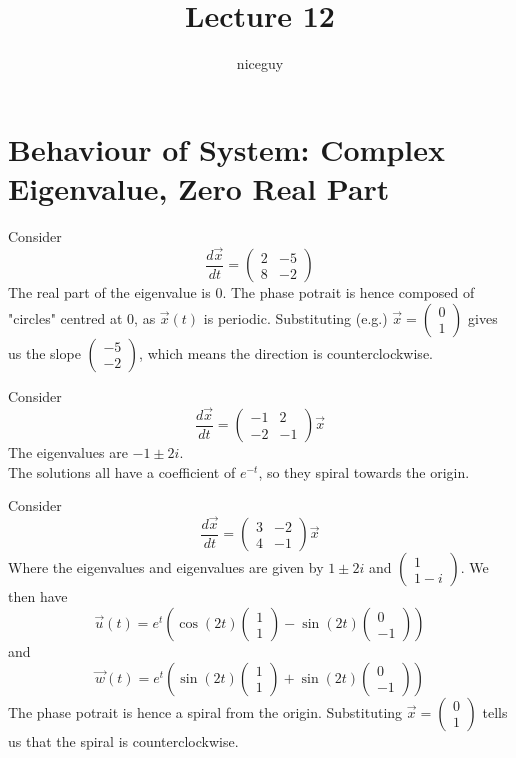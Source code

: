 \documentclass[12pt]{article}
\title{Lecture 12}
\author{niceguy}
\begin{document}
\maketitle

\section{Behaviour of System: Complex Eigenvalue, Zero Real Part}
Consider
$$\frac{d\vec{x}}{dt} = \begin{pmatrix} 2 & -5 \\ 8 & -2 \end{pmatrix}$$
The real part of the eigenvalue is 0. The phase potrait is hence composed of "circles" centred at 0, as $\vec{x}(t)$ is periodic. Substituting (e.g.) $\vec{x} = \begin{pmatrix} 0 \\ 1 \end{pmatrix}$ gives us the slope $\begin{pmatrix} -5 \\ -2 \end{pmatrix}$, which means the direction is counterclockwise.

\begin{ex}
	Consider
	$$\frac{d\vec{x}}{dt} = \begin{pmatrix} -1 & 2 \\ -2 & -1 \end{pmatrix} \vec{x}$$
	The eigenvalues are $-1 \pm 2i$. \\
	The solutions all have a coefficient of $e^{-t}$, so they spiral towards the origin.
\end{ex}

\begin{ex}
	Consider
	$$\frac{d\vec{x}}{dt} = \begin{pmatrix} 3 & -2 \\ 4 & -1 \end{pmatrix}\vec{x}$$
	Where the eigenvalues and eigenvalues are given by $1 \pm 2i$ and $\begin{pmatrix} 1 \\ 1-i \end{pmatrix}$. We then have
	$$\vec{u}(t) = e^t\left(\cos(2t)\begin{pmatrix} 1 \\ 1\end{pmatrix} - \sin(2t)\begin{pmatrix} 0 \\ -1\end{pmatrix}\right)$$
	and
	$$\vec{w}(t) = e^t\left(\sin(2t)\begin{pmatrix} 1 \\ 1 \end{pmatrix} + \sin(2t) \begin{pmatrix} 0 \\ -1 \end{pmatrix}\right)$$
	The phase potrait is hence a spiral from the origin. Substituting $\vec{x} = \begin{pmatrix} 0 \\ 1 \end{pmatrix}$ tells us that the spiral is counterclockwise.
\end{ex}
\end{document}
